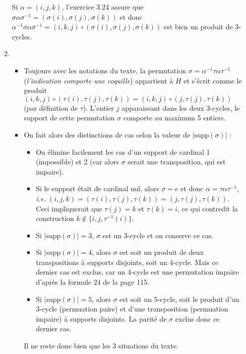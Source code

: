\begin{enumerate}[1)]
\begin{enumerate}
     Si $\alpha = (i,j,k)$, l'exercice 3.24 assure que $\sigma \alpha \sigma^{-1} = \left(\sigma(i), \sigma(j), \sigma(k)  \right)$ et donc $\alpha^{-1} \sigma \alpha \sigma^{-1} = (i,k,j) \circ \left(\sigma(i), \sigma(j), \sigma(k)  \right)$ est bien un produit de 3-cycles.

     \item \begin{itemize}[$\bullet$]
            \item Toujours avec les notations du texte, la permutation $\sigma = \alpha^{-1} \tau \alpha \tau^{-1}$ (\emph{l'indication comporte une coquille}) appartient à $H$ et s'écrit comme le produit $ (i,k,j) \circ \left(\tau(i), \tau(j), \tau(k)  \right) = (i,k,j) \circ \left(j, \tau(j), \tau(k)  \right)$ (par définition de $\tau$). L'entier $j$ apparaissant dans les deux 3-cycles, le support de cette permutation $\sigma$ comporte au maximum 5 entiers.

            \item
            On fait alors  des distinctions de cas selon la valeur de $|\text{supp}(\sigma)|$ :
            \begin{itemize}
             \item  On élimine facilement les cas d'un support de cardinal 1 (impossible) et 2 (car alors $\sigma$ serait une transposition, qui est impaire).
             \item Si le support était de cardinal nul, alors $\sigma = e$ et donc $\alpha = \tau \alpha \tau^{-1}$, \textit{i.e.} $(i,j,k) = (\tau(i), \tau(j), \tau(k)) = (j, \tau(j), \tau(k))$. Ceci impliquerait que $\tau(j) = k$ et $\tau(k) = i$, ce qui contredit la construction $k\notin \{i,j, \tau^{-1}(i)\}$.
             \item Si $|\text{supp}(\sigma)| = 3$, $\sigma$ est un 3-cycle et on conserve ce cas.
             \item Si $|\text{supp}(\sigma)| = 4$, alors $\sigma$ est soit un produit de deux transpositions à supports disjoints, soit un 4-cycle. Mais ce dernier cas est exclus, car un 4-cycle est une permutation impaire d'après la formule 24 de la page 115.
             \item Si $|\text{supp}(\sigma)| = 5$, alors  $\sigma$ est soit un 5-cycle, soit le produit d'un 3-cycle (permuation paire) et d'une transposition (permuation impaire) à supports disjoints. La parité de $\sigma$ exclus donc ce dernier cas.
            \end{itemize}
            Il ne reste donc bien que les 3 situations du texte.


\end{itemize}
\end{enumerate}
\end{enumerate}
